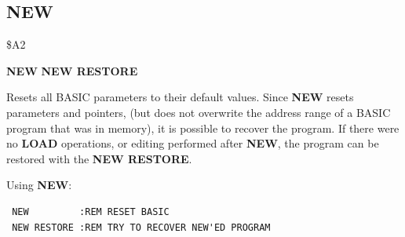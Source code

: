 \subsection{NEW}
\begin{description}[leftmargin=2cm,style=nextline]
\item [Token:] \$A2
\item [Format:] {\bf NEW}
                {\bf NEW RESTORE}
\item [Usage:]  Resets all BASIC parameters to their default values.
                Since {\bf NEW} resets parameters and pointers,
                (but does not overwrite the address
                range of a BASIC program that was in memory),
                it is possible to recover the
                program. If there were no {\bf LOAD} operations,
                or editing performed after {\bf NEW}, the program
                can be restored with the {\bf NEW RESTORE}.
\item [Examples:] Using {\bf NEW}:
\begin{tcolorbox}[colback=black,coltext=white]
\verbatimfont{\codefont}
\begin{verbatim}
 NEW         :REM RESET BASIC
 NEW RESTORE :REM TRY TO RECOVER NEW'ED PROGRAM
\end{verbatim}
\end{tcolorbox}
\end{description}


\newpage
